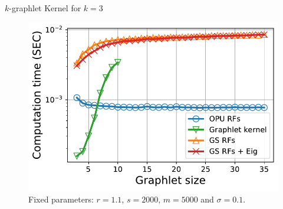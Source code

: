 \documentclass{beamer}
\begin{document}
\begin{frame}{$k$-graphlet Kernel for $k=3$}
\footnotesize
\begin{figure}[H]
\centering
\includegraphics[scale=0.4]{figs/computational_comp.pdf}
\vfill
\centering  Fixed parameters: $r=1.1$,  $s=2000$, $m=5000$ and  $\sigma =0.1$.
\end{figure}
\end{frame}



\end{document}
